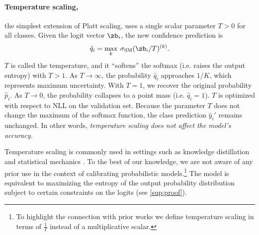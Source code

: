 \paragraph{Temperature scaling,} the simplest extension of Platt scaling, uses a single scalar parameter $T > 0$ for all classes. Given the logit vector $\zb_i$, the new confidence prediction is
\begin{equation}
\label{temp}
\hat q_i = \max_k \: \sigma_\text{SM} ( \zb_i / T)^{(k)}.
\end{equation}
$T$ is called the temperature, and it ``softens'' the softmax (i.e. raises the output entropy) with $T > 1$.
As $T \rightarrow \infty$, the probability $\hat q_i$ approaches $1/K$, which represents maximum uncertainty. With $T=1$, we recover the original probability $\hat p_i$.
As $T \rightarrow 0$, the probability collapses to a point mass (i.e. $\hat q_i = 1$).
$T$ is optimized with respect to NLL on the validation set.
Because the parameter $T$ does not change the maximum of the softmax function, the class prediction $\hat y_i'$ remains unchanged. In other words, \emph{temperature scaling does not affect the model's accuracy.}

Temperature scaling is commonly used in settings such as knowledge distillation \citep{hinton2015distilling} and statistical mechanics \citep{jaynes1957information}. To the best of our knowledge, we are not aware of any prior use in the context of calibrating probabilistic models.\footnote{To highlight the connection with prior works we define temperature scaling in terms of $\frac{1}{T}$ instead of a multiplicative scalar.}
The model is equivalent to maximizing the entropy of the output probability distribution subject to certain constraints on the logits (see \autoref{sup:proof}).


